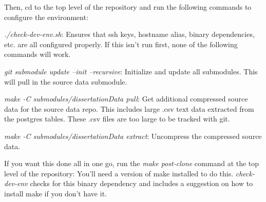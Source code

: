 \documentclass[man,floatsintext,donotrepeattitle]{apa6}
\begin{document}
Then, cd to the top level of the repository and run the following commands to configure the environment:

\begin{singlespace}
\begin{compactitem} 
  \item \emph{./check-dev-env.sh}:
    Ensures that ssh keys, hostname alias, binary dependencies, etc. are all configured properly.
    If this isn't run first, none of the following commands will work.
  \item \emph{git submodule update --init --recursive}:
    Initialize and update all submodules.
    This will pull in the source data submodule.
  \item \emph{make -C submodules/dissertationData pull}:
    Get additional compressed source data for the source data repo.
    This includes large .csv text data extracted from the postgres tables.
    These .csv files are too large to be tracked with git.
  \item \emph{make -C submodules/dissertationData extract}:
    Uncompress the compressed source data.
\end{compactitem}
\end{singlespace}

If you want this done all in one go, run the \emph{make post-clone} command at the top level of the repository:
You'll need a version of make installed to do this.
\emph{check-dev-env} checks for this binary dependency and includes a suggestion on how to install make if you don't have it.

\printbibliography[heading=bibintoc]
\end{document}
